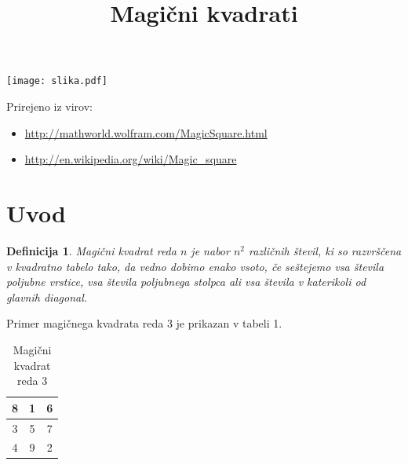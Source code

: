 \documentclass[a4paper,12pt]{article}
\title{Magični kvadrati}
\date{}
\newtheorem{Definicija}{Definicija}
\begin{document}
\begin{center}
   \texttt{[image: slika.pdf]}
\end{center}

Prirejeno iz virov:

\begin{itemize}
   \item \url{http://mathworld.wolfram.com/MagicSquare.html}
   \item \url{http://en.wikipedia.org/wiki/Magic_square}
\end{itemize}

\tableofcontents 

\newpage

\section{Uvod}

\begin{Definicija}
   \emph{Magični kvadrat} reda $n$ je nabor $n^2$ različnih števil,
   ki so razvrščena v kvadratno tabelo tako, da vedno dobimo enako vsoto,
   če seštejemo vsa števila poljubne vrstice, vsa števila poljubnega
   stolpca ali vsa števila v katerikoli od glavnih diagonal.
\end{Definicija}

Primer magičnega kvadrata reda 3 je prikazan v tabeli 1.

   \begin{table}
      \caption{Magični kvadrat reda 3}
      \label{table:mag3}
     \begin{center}
       \begin{tabular}{|c|c|c|}
          \hline
          8 & 1 & 6 \\ \hline 
          3 & 5 & 7 \\ \hline
          4 & 9 & 2 \\ \hline
       \end{tabular}
     \end{center}
   \end{table}
\end{document}
